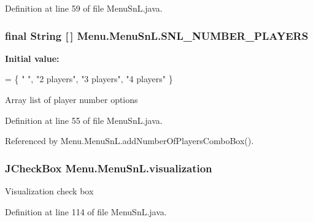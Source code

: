 Definition at line 59 of file Menu\+Sn\+L.\+java.

\hypertarget{class_menu_1_1_menu_sn_l_accdb88464884a651bab3a9ebb5eb2beb}{}
\subsubsection[{S\+N\+L\+\_\+\+N\+U\+M\+B\+E\+R\+\_\+\+P\+L\+A\+Y\+E\+R\+S}]{\setlength{\rightskip}{0pt plus 5cm}final String \mbox{[}$\,$\mbox{]} Menu.\+Menu\+Sn\+L.\+S\+N\+L\+\_\+\+N\+U\+M\+B\+E\+R\+\_\+\+P\+L\+A\+Y\+E\+R\+S\hspace{0.3cm}{\ttfamily [private]}}\label{class_menu_1_1_menu_sn_l_accdb88464884a651bab3a9ebb5eb2beb}
{\bfseries Initial value\+:}
\begin{DoxyCode}
= \{ \textcolor{stringliteral}{" "}, \textcolor{stringliteral}{"2 players"},
            \textcolor{stringliteral}{"3 players"}, \textcolor{stringliteral}{"4 players"} \}
\end{DoxyCode}
Array list of player number options 

Definition at line 55 of file Menu\+Sn\+L.\+java.



Referenced by Menu.\+Menu\+Sn\+L.\+add\+Number\+Of\+Players\+Combo\+Box().

\hypertarget{class_menu_1_1_menu_sn_l_a774bdc16dab9d1c0c882d2212beb70ac}{}
\subsubsection[{visualization}]{\setlength{\rightskip}{0pt plus 5cm}J\+Check\+Box Menu.\+Menu\+Sn\+L.\+visualization\hspace{0.3cm}{\ttfamily [private]}}\label{class_menu_1_1_menu_sn_l_a774bdc16dab9d1c0c882d2212beb70ac}
Visualization check box 

Definition at line 114 of file Menu\+Sn\+L.\+java.

\hypertarget{class_menu_1_1_menu_sn_l_a32c2e05c64b453df29d8b6df1061a939}{}
